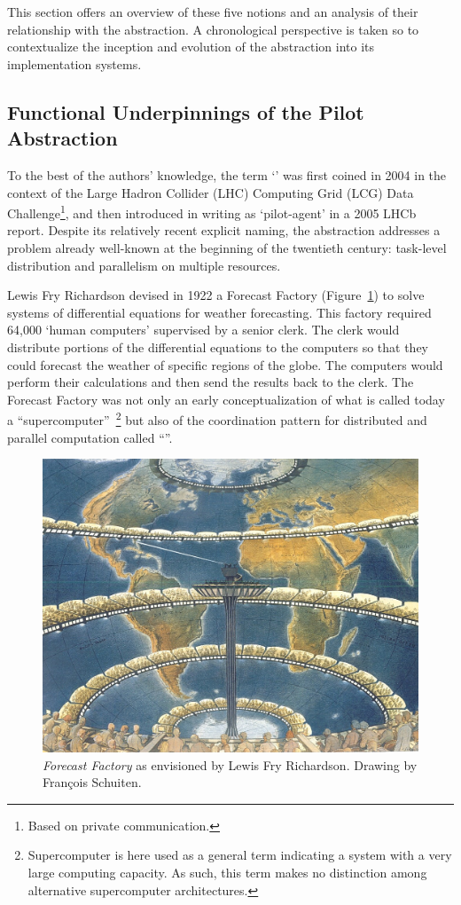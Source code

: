 \documentclass{sig-alternate}
\begin{document}
This section offers an overview of these five notions and an analysis of their
relationship with the \pilot abstraction. A chronological perspective is taken
so to contextualize the inception and evolution of the \pilot abstraction into
its implementation systems.


\subsection{Functional Underpinnings of the Pilot Abstraction}
\label{sec:histabstr}

To the best of the authors' knowledge, the term `\pilot' was first coined in
2004 in the context of the Large Hadron Collider (LHC) Computing Grid (LCG)
Data Challenge\footnote{Based on private communication.}, and then introduced
in writing as `pilot-agent' in a 2005 LHCb report\cite{lhcb2005}. Despite its
relatively recent explicit naming, the \pilot abstraction addresses a problem
already well-known at the beginning of the twentieth century: task-level
distribution and parallelism on multiple resources.

Lewis Fry Richardson devised in 1922 a Forecast Factory
(Figure~\ref{fig:figures_forecast-factory}) to solve systems of differential
equations for weather forecasting. This factory required 64,000 `human
computers' supervised by a senior clerk. The clerk would distribute portions of
the differential equations to the computers so that they could forecast the
weather of specific regions of the globe. The computers would perform their
calculations and then send the results back to the clerk. The Forecast Factory
was not only an early conceptualization of what is called today a
``supercomputer''~\footnote{Supercomputer is here used as a general term
  indicating a system with a very large computing capacity. As such, this term
  makes no distinction among alternative supercomputer architectures.} but also
of the coordination pattern for distributed and parallel computation called
``\MW''.

\begin{figure}[t]
  \centering
    \includegraphics[width=.45\textwidth]{figures/forecast-factory.jpg}
  \caption{\textit{Forecast Factory} as envisioned by Lewis Fry Richardson.
    Drawing by Fran{\c c}ois Schuiten.}
  \label{fig:figures_forecast-factory}
\end{figure}
\end{document}
